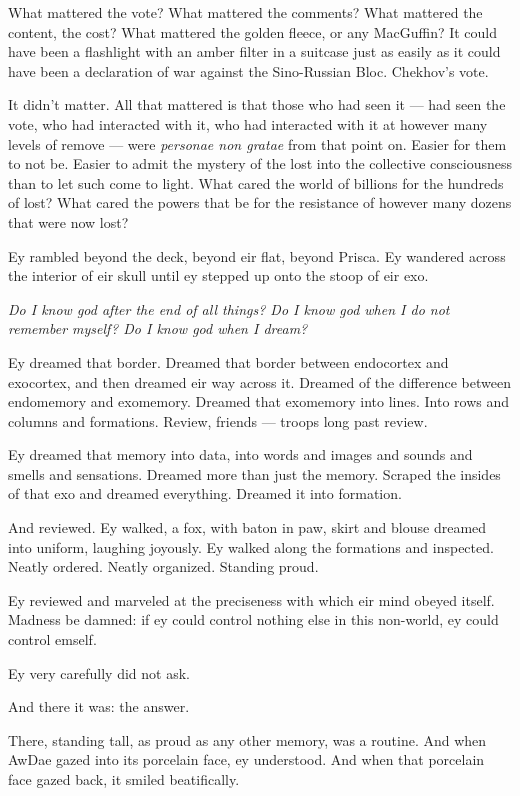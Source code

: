 What mattered the vote? What mattered the comments? What mattered the content, the cost? What mattered the golden fleece, or any MacGuffin? It could have been a flashlight with an amber filter in a suitcase just as easily as it could have been a declaration of war against the Sino-Russian Bloc. Chekhov's vote.

It didn't matter. All that mattered is that those who had seen it — had seen the vote, who had interacted with it, who had interacted with it at however many levels of remove — were \emph{personae non gratae} from that point on. Easier for them to not be. Easier to admit the mystery of the lost into the collective consciousness than to let such come to light. What cared the world of billions for the hundreds of lost? What cared the powers that be for the resistance of however many dozens that were now lost?

Ey rambled beyond the deck, beyond eir flat, beyond Prisca. Ey wandered across the interior of eir skull until ey stepped up onto the stoop of eir exo.

\emph{Do I know god after the end of all things? Do I know god when I do not remember myself? Do I know god when I dream?}

Ey dreamed that border. Dreamed that border between endocortex and exocortex, and then dreamed eir way across it. Dreamed of the difference between endomemory and exomemory. Dreamed that exomemory into lines. Into rows and columns and formations. Review, friends — troops long past review.

Ey dreamed that memory into data, into words and images and sounds and smells and sensations. Dreamed more than just the memory. Scraped the insides of that exo and dreamed everything. Dreamed it into formation.

And reviewed. Ey walked, a fox, with baton in paw, skirt and blouse dreamed into uniform, laughing joyously. Ey walked along the formations and inspected. Neatly ordered. Neatly organized. Standing proud.

Ey reviewed and marveled at the preciseness with which eir mind obeyed itself. Madness be damned: if ey could control nothing else in this non-world, ey could control emself.

Ey very carefully did not ask.

And there it was: the answer.

There, standing tall, as proud as any other memory, was a routine. And when AwDae gazed into its porcelain face, ey understood. And when that porcelain face gazed back, it smiled beatifically.

